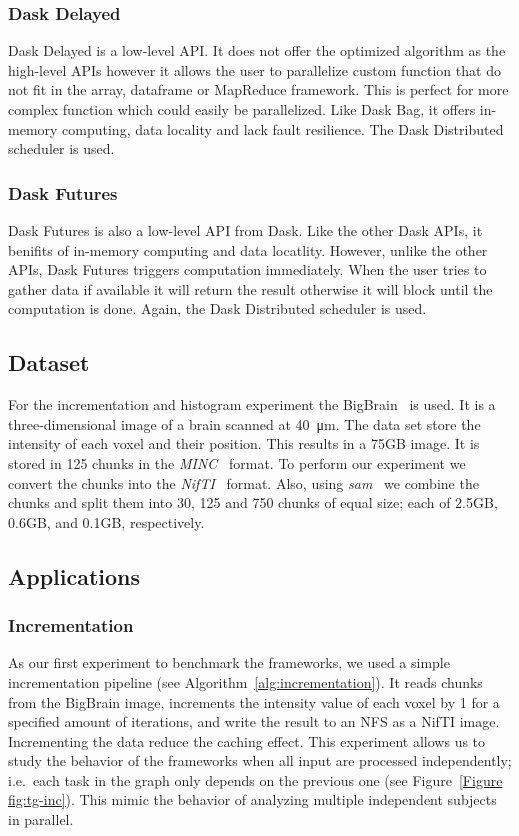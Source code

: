 \documentclass[conference]{IEEEtran}
\begin{document}
\subsubsection{Dask Delayed~\cite{dask-delayed}} Dask Delayed is a low-level API. It
does not offer the optimized algorithm as the high-level APIs however it allows the
user to parallelize custom function that do not fit in the array, dataframe or
MapReduce framework. This is perfect for more complex function which could easily be
parallelized. Like Dask Bag, it offers in-memory computing, data locality and lack
fault resilience. The Dask Distributed scheduler is used.

\subsubsection{Dask Futures~\cite{dask-futures}} Dask Futures is also a low-level API
from Dask. Like the other Dask APIs, it benifits of in-memory computing and data
locatlity. However, unlike the other APIs, Dask Futures triggers computation
immediately. When the user tries to gather data if available it will return the
result otherwise it will block until the computation is done. Again, the Dask
Distributed scheduler is used.


\subsection{Dataset}
For the incrementation and histogram experiment the BigBrain~\cite{Amunts:13} is
used. It is a three-dimensional image of a brain scanned at \SI{40}{\micro\metre}.
The data set store the intensity of each voxel and their position. This results in a
75GB image. It is stored in 125 chunks in the \textit{MINC}~\cite{minc} format. To
perform our experiment we convert the chunks into the \textit{NifTI}~\cite{nifti}
format. Also, using \textit{sam}~\cite{sam} we combine the chunks and split them into
30, 125 and 750 chunks of equal size; each of 2.5GB, 0.6GB, and 0.1GB, respectively.

\subsection{Applications}
\subsubsection{\textbf{Incrementation}}
As our first experiment to benchmark the frameworks, we used a simple incrementation
pipeline (see Algorithm~\ref{alg:incrementation}). It reads chunks from the BigBrain
image, increments the intensity value of each voxel by 1 for a specified amount of
iterations, and write the result to an NFS as a NifTI image. Incrementing the data
reduce the caching effect. This experiment allows us to study the behavior of the
frameworks when all input are processed independently; i.e.\ each task in the graph
only depends on the previous one (see Figure~\ref{Figure fig:tg-inc}). This mimic the
behavior of analyzing multiple independent subjects in parallel.
\end{document}
